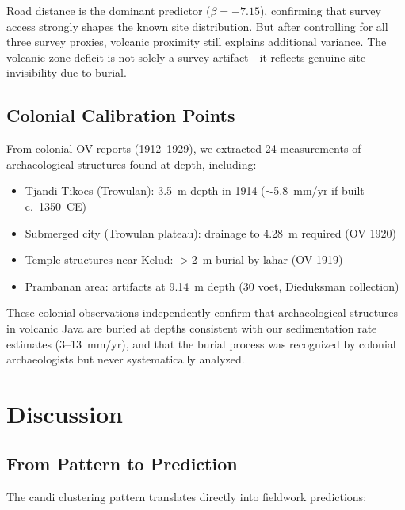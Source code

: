 \documentclass[12pt,a4paper]{article}
\begin{document}
Road distance is the dominant predictor ($\beta=-7.15$), confirming that survey access strongly shapes the known site distribution. But after controlling for all three survey proxies, volcanic proximity still explains additional variance. The volcanic-zone deficit is not solely a survey artifact---it reflects genuine site invisibility due to burial.

\subsection{Colonial Calibration Points}
\label{sec:validation}

From colonial OV reports (1912--1929), we extracted 24 measurements of archaeological structures found at depth, including:

\begin{itemize}
    \item Tjandi Tikoes (Trowulan): 3.5~m depth in 1914 ($\sim$5.8~mm/yr if built c.\ 1350~CE)
    \item Submerged city (Trowulan plateau): drainage to 4.28~m required (OV 1920)
    \item Temple structures near Kelud: $>$2~m burial by lahar (OV 1919)
    \item Prambanan area: artifacts at 9.14~m depth (30 voet, Dieduksman collection)
\end{itemize}

These colonial observations independently confirm that archaeological structures in volcanic Java are buried at depths consistent with our sedimentation rate estimates (3--13~mm/yr), and that the burial process was recognized by colonial archaeologists but never systematically analyzed.

\section{Discussion}

\subsection{From Pattern to Prediction}

The candi clustering pattern translates directly into fieldwork predictions:
\end{document}
